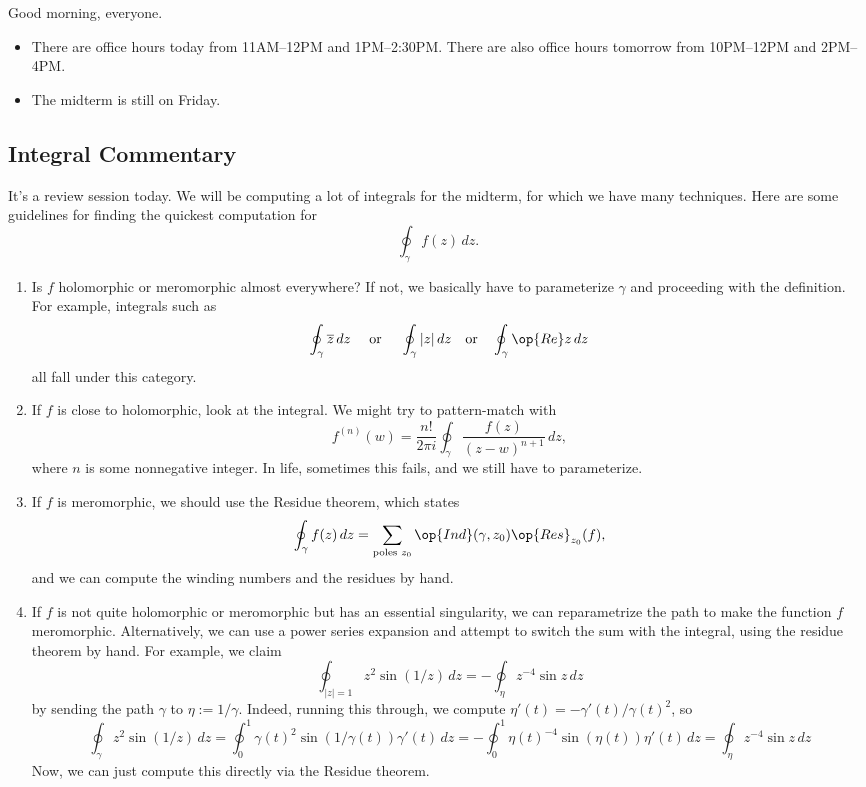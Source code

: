 
Good morning, everyone.
\begin{itemize}
	\item There are office hours today from 11AM--12PM and 1PM--2:30PM. There are also office hours tomorrow from 10PM--12PM and 2PM--4PM.
	\item The midterm is still on Friday.
\end{itemize}

\subsection{Integral Commentary}
It's a review session today. We will be computing a lot of integrals for the midterm, for which we have many techniques. Here are some guidelines for finding the quickest computation for
\[\oint_\gamma f(z)\,dz.\]
\begin{enumerate}
	\item Is $f$ holomorphic or meromorphic almost everywhere? If not, we basically have to parameterize $\gamma$ and proceeding with the definition. For example, integrals such as
	\[\oint_\gamma\overline z\,dz\quad\text{ or }\quad\oint_\gamma|z|\,dz\quad\text{or}\quad\oint_\gamma\op{Re}z\,dz\]
	all fall under this category.

	\item If $f$ is close to holomorphic, look at the integral. We might try to pattern-match with
	\[f^{(n)}(w)=\frac{n!}{2\pi i}\oint_\gamma\frac{f(z)}{(z-w)^{n+1}}\,dz,\]
	where $n$ is some nonnegative integer. In life, sometimes this fails, and we still have to parameterize.
	\item If $f$ is meromorphic, we should use the Residue theorem, which states
	\[\oint_\gamma f(z)\,dz=\sum_{\text{poles }z_0}\op{Ind}(\gamma,z_0)\op{Res}_{z_0}(f),\]
	and we can compute the winding numbers and the residues by hand.
	\item If $f$ is not quite holomorphic or meromorphic but has an essential singularity, we can reparametrize the path to make the function $f$ meromorphic. Alternatively, we can use a power series expansion and attempt to switch the sum with the integral, using the residue theorem by hand. For example, we claim
	\[\oint_{|z|=1}z^2\sin(1/z)\,dz=-\oint_\eta z^{-4}\sin z\,dz\]
	by sending the path $\gamma$ to $\eta:=1/\gamma$. Indeed, running this through, we compute $\eta'(t)=-\gamma'(t)/\gamma(t)^2$, so
	\[\oint_{\gamma}z^2\sin(1/z)\,dz=\oint_0^1\gamma(t)^2\sin(1/\gamma(t))\gamma'(t)\,dz=-\oint_0^1\eta(t)^{-4}\sin(\eta(t))\eta'(t)\,dz=\oint_\eta z^{-4}\sin z\,dz\]
	Now, we can just compute this directly via the Residue theorem.
\end{enumerate}

